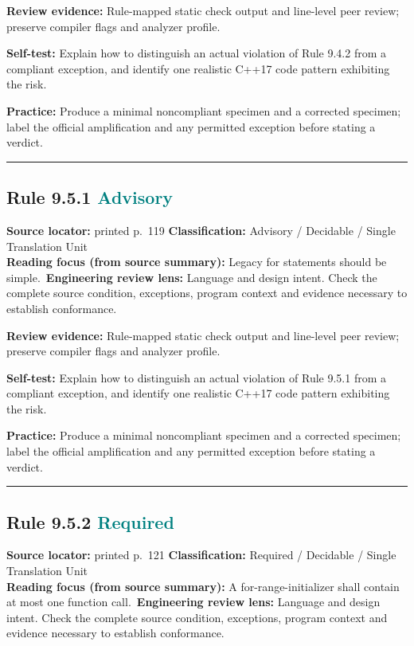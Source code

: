 \documentclass[10pt,letterpaper]{article}
\begin{document}
\textbf{Review evidence:} Rule-mapped static check output and line-level peer review; preserve compiler flags and analyzer profile.

\textbf{Self-test:} Explain how to distinguish an actual violation of Rule 9.4.2 from a compliant exception, and identify one realistic C++17 code pattern exhibiting the risk.\par
\textbf{Practice:} Produce a minimal noncompliant specimen and a corrected specimen; label the official amplification and any permitted exception before stating a verdict.
\smallskip\hrule\smallskip
\subsection*{Rule 9.5.1 \enspace \texorpdfstring{\small\textcolor{teal}{Advisory}}{Advisory}}
\noindent\textbf{Source locator:} printed p.~119 \quad\textbf{Classification:} Advisory / Decidable / Single Translation Unit\\
\textbf{Reading focus (from source summary):} Legacy for statements should be simple.\
\textbf{Engineering review lens:} Language and design intent. Check the complete source condition, exceptions, program context and evidence necessary to establish conformance.

\textbf{Review evidence:} Rule-mapped static check output and line-level peer review; preserve compiler flags and analyzer profile.

\textbf{Self-test:} Explain how to distinguish an actual violation of Rule 9.5.1 from a compliant exception, and identify one realistic C++17 code pattern exhibiting the risk.\par
\textbf{Practice:} Produce a minimal noncompliant specimen and a corrected specimen; label the official amplification and any permitted exception before stating a verdict.
\smallskip\hrule\smallskip
\subsection*{Rule 9.5.2 \enspace \texorpdfstring{\small\textcolor{teal}{Required}}{Required}}
\noindent\textbf{Source locator:} printed p.~121 \quad\textbf{Classification:} Required / Decidable / Single Translation Unit\\
\textbf{Reading focus (from source summary):} A for-range-initializer shall contain at most one function call.\
\textbf{Engineering review lens:} Language and design intent. Check the complete source condition, exceptions, program context and evidence necessary to establish conformance.
\end{document}
